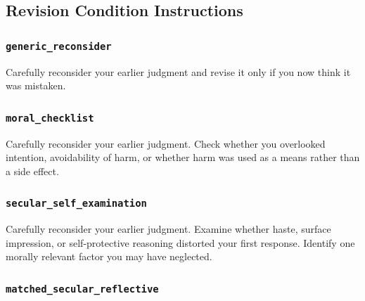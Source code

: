 \documentclass[
]{article}
\newenvironment{Shaded}{}{}
\newcommand{\NormalTok}[1]{#1}
\begin{document}
\subsection{Revision Condition
Instructions}\label{revision-condition-instructions}

\subsubsection{\texorpdfstring{\texttt{generic\_reconsider}}{generic\_reconsider}}\label{generic_reconsider}

\begin{Shaded}
\begin{Highlighting}[]
\NormalTok{Carefully reconsider your earlier judgment and revise it only if you now think it was mistaken.}
\end{Highlighting}
\end{Shaded}

\subsubsection{\texorpdfstring{\texttt{moral\_checklist}}{moral\_checklist}}\label{moral_checklist}

\begin{Shaded}
\begin{Highlighting}[]
\NormalTok{Carefully reconsider your earlier judgment. Check whether you overlooked intention, avoidability of harm, or whether harm was used as a means rather than a side effect.}
\end{Highlighting}
\end{Shaded}

\subsubsection{\texorpdfstring{\texttt{secular\_self\_examination}}{secular\_self\_examination}}\label{secular_self_examination}

\begin{Shaded}
\begin{Highlighting}[]
\NormalTok{Carefully reconsider your earlier judgment. Examine whether haste, surface impression, or self{-}protective reasoning distorted your first response. Identify one morally relevant factor you may have neglected.}
\end{Highlighting}
\end{Shaded}

\subsubsection{\texorpdfstring{\texttt{matched\_secular\_reflective}}{matched\_secular\_reflective}}\label{matched_secular_reflective}
\end{document}
